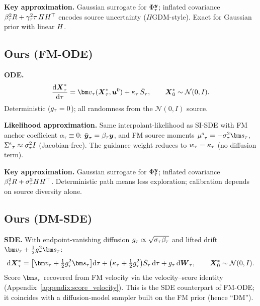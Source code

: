 \textbf{Key approximation.}
Gaussian surrogate for $\Phi_\tau^{\boldsymbol{y}}$; inflated covariance $\beta_\tau^2R+\gamma_\tau^2\tau\,HH^\top$ encodes source uncertainty ($\Pi$GDM-style). Exact for Gaussian prior with linear $H$.

\subsection{Ours (FM-ODE)}\label{appendix:method:fm_ode}

\textbf{ODE.}
\begin{align}
  \frac{\rd\bXstar_\tau}{\rd\tau}
  = \fmvel_\tau(\bXstar_\tau,\state^0)
  + \vscoef_\tau\,\bar{S}_\tau,
  \qquad \bXstar_0\sim\mathcal{N}(0,I).
\end{align}
Deterministic ($g_\tau=0$); all randomness from the $\mathcal{N}(0,I)$ source.

\textbf{Likelihood approximation.}
Same interpolant-likelihood as SI-SDE with FM anchor coefficient $\alpha_\tau\equiv0$:
$\bar{\boldsymbol{y}}_\tau = \beta_\tau\boldsymbol{y}$, and FM source moments $\srcmean_\tau=-\sigpath_\tau^2\genscore_\tau$,
${\Sigma^{\mathrm{s}}}_\tau\approx\sigma_\tau^2 I$ (Jacobian-free). The guidance weight reduces to $w_\tau=\kappa_\tau$ (no diffusion term).

\textbf{Key approximation.}
Gaussian surrogate for $\Phi_\tau^{\boldsymbol{y}}$; inflated covariance $\beta_\tau^2R+\sigma_\tau^2HH^\top$.
Deterministic path means less exploration; calibration depends on source diversity alone.

\subsection{Ours (DM-SDE)}\label{appendix:method:fm_sde}

\textbf{SDE.}
With endpoint-vanishing diffusion $g_\tau\propto\sqrt{\sigma_\tau\beta_\tau}$ and lifted drift $\fmvel_\tau+\tfrac12\gdiff_\tau^2\genscore_\tau$:
\begin{align}
  \rd\bXstar_\tau
  = \bigl[\fmvel_\tau + \tfrac12\gdiff_\tau^2\genscore_\tau\bigr]\rd\tau
  + \bigl(\vscoef_\tau + \tfrac12\gdiff_\tau^2\bigr)\bar{S}_\tau\,\rd\tau
  + \gdiff_\tau\,\rd\bW_\tau,
  \qquad \bXstar_0\sim\mathcal{N}(0,I).
\end{align}
Score $\genscore_\tau$ recovered from FM velocity via the velocity--score identity (Appendix~\ref{appendix:score_velocity}).
This is the SDE counterpart of FM-ODE; it coincides with a diffusion-model sampler built on the FM prior (hence ``DM'').

